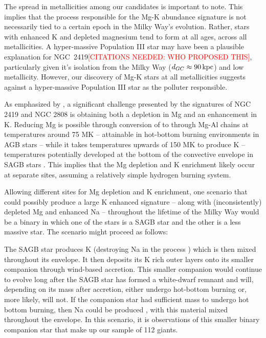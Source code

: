 \documentclass[a4paper,fleqn,usenatbib]{mnras}
\newcommand{\todo}[1]{\textcolor{red}{#1}}
\begin{document}

The spread in metallicities among our candidates is important to note. This implies that the process responsible for the Mg-K abundance signature is not necessarily tied to a certain epoch in the Milky Way's evolution. Rather, stars with enhanced K and depleted magnesium tend to form at all ages, across all metallicities. A hyper-massive Population III star may have been a plausible explanation for NGC~2419\todo{[CITATIONS NEEDED: WHO PROPOSED THIS]}, particularly given it's isolation from the Milky Way ($d_{GC} \approx 90\,{\rm kpc}$) and low metallicity. However, our discovery of Mg-K stars at all metallicities suggests against a hyper-massive Population III star as the polluter responsible.



As emphasized by \cite{prantzos2017}, a significant challenge presented by the signatures of NGC 2419 and NGC 2808 is obtaining both a depletion in Mg and an enhancement in K. Reducing Mg is possible through conversion of  to  through Mg-Al chains at temperatures around 75 MK --  attainable in hot-bottom burning environments in AGB stars -- while it takes temperatures upwards of 150 MK to produce K -- temperatures potentially developed at the bottom of the convective envelope in SAGB stars \citep{iliadis2016}. This implies that the Mg depletion and K enrichment likely occur at separate sites, assuming a relatively simple hydrogen burning system.

Allowing different sites for Mg depletion and K enrichment, one scenario that could possibly produce a large K enhanced signature -- along with (inconsistently) depleted Mg and enhanced Na -- throughout the lifetime of the Milky Way would be a binary in which one of the stars is a SAGB star and the other is a less massive star. The scenario might proceed as follows:

The SAGB star produces K (destroying Na in the process \citep{prantzos2017}) which is then mixed throughout its envelope. It then deposits its K rich outer layers onto its smaller companion through wind-based accretion. This smaller companion would continue to evolve long after the SAGB star has formed a white-dwarf remnant and will, depending on its mass after accretion, either undergo hot-bottom burning or, more likely, will not. If the companion star had sufficient mass to undergo hot bottom burning, then Na could be produced \citep{prantzos2017}, with this material mixed throughout the envelope. In this scenario, it is observations of this smaller binary companion star that make up our sample of 112 giants.
\end{document}
